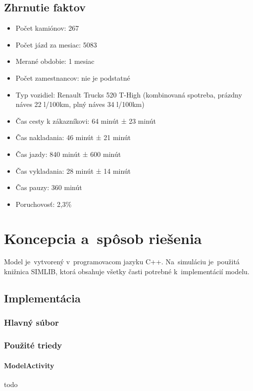 \documentclass[a4paper, 11pt]{article}
\begin{document}
    \subsection{Zhrnutie faktov}
    \begin{itemize}
        \item Počet kamiónov: 267
        \item Počet jázd za mesiac: 5083
        \item Merané obdobie: 1 mesiac
        \item Počet zamestnancov: nie je podstatné
        \item Typ vozidiel: Renault Trucks 520 T-High (kombinovaná spotreba, prázdny náves 22 l/100km, plný náves 34 l/100km)
        \item Čas cesty k zákazníkovi: 64 minút ± 23 minút
        \item Čas nakladania: 46 minút ± 21 minút
        \item Čas jazdy: 840 minút ± 600 minút
        \item Čas vykladania: 28 minút ± 14 minút
        \item Čas pauzy: 360 minút
        \item Poruchovosť: 2,3\%
    \end{itemize}

	\newpage
    \section{Koncepcia a~spôsob riešenia}
	Model je~vytvorený v~programovacom jazyku C++. Na~simuláciu je~použitá knižnica
    SIMLIB, ktorá obsahuje všetky časti potrebné k~implementácií modelu.

    \subsection{Implementácia}

    \subsubsection{Hlavný súbor}

    \subsubsection{Použité triedy}
    \paragraph{ModelActivity}
    todo
\end{document}

